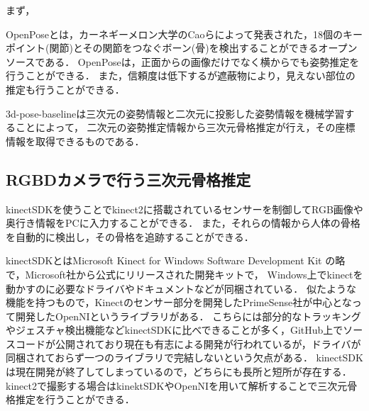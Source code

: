 \documentclass[titlepage]{jarticle}
\begin{document}
まず，

OpenPoseとは，カーネギーメロン大学のCaoらによって発表された，18個のキーポイント(関節)とその関節をつなぐボーン(骨)を検出することができるオープンソースである．
OpenPoseは，正面からの画像だけでなく横からでも姿勢推定を行うことができる．
また，信頼度は低下するが遮蔽物により，見えない部位の推定も行うことができる．

3d-pose-baselineは三次元の姿勢情報と二次元に投影した姿勢情報を機械学習することによって，
二次元の姿勢推定情報から三次元骨格推定が行え，その座標情報を取得できるものである．

\subsection{RGBDカメラで行う三次元骨格推定}
kinectSDK\cite{kinectSDK}を使うことでkinect2に搭載されているセンサーを制御してRGB画像や奥行き情報をPCに入力することができる．
また，それらの情報から人体の骨格を自動的に検出し，その骨格を追跡することができる．

kinectSDKとはMicrosoft Kinect for Windows Software Development Kit の略で，Microsoft社から公式にリリースされた開発キットで，
Windows上でkinectを動かすのに必要なドライバやドキュメントなどが同梱されている．
似たような機能を持つもので，Kinectのセンサー部分を開発したPrimeSense社が中心となって開発したOpenNIというライブラリがある．
こちらには部分的なトラッキングやジェスチャ検出機能などkinectSDKに比べできることが多く，GitHub上でソースコードが公開されており現在も有志による開発が行われているが，ドライバが同梱されておらず一つのライブラリで完結しないという欠点がある．
kinectSDKは現在開発が終了してしまっているので，どちらにも長所と短所が存在する．%
kinect2で撮影する場合はkinektSDKやOpenNIを用いて解析することで三次元骨格推定を行うことができる．

%
%
%
\end{document}
